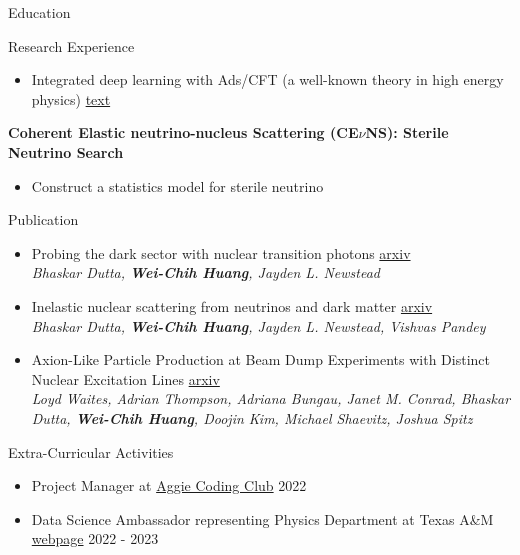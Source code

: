 \documentclass{resume}
\begin{document}
\begin{rSection}{Education}
\begin{rSection}{Research Experience}
\begin{itemize}
    \itemsep -3pt {}
    \item Integrated deep learning with Ads/CFT (a well-known theory in high energy physics) \href{https://noctildon.github.io/files/pdf/archive/DL.pdf}{text}
    \end{itemize}
\item \textbf{Coherent Elastic neutrino-nucleus Scattering (CE$\nu$NS): Sterile Neutrino Search}
    \begin{itemize}
    \itemsep -3pt {}
    \item Construct a statistics model for sterile neutrino
    \end{itemize}
\end{rSection}


\begin{rSection}{Publication}
    \begin{itemize}
        \item Probing the dark sector with nuclear transition photons \hfill \href{https://arxiv.org/pdf/2302.10250.pdf}{arxiv}\\
        {\footnotesize \it Bhaskar Dutta, \textbf{Wei-Chih Huang}, Jayden L. Newstead}
        \item Inelastic nuclear scattering from neutrinos and dark matter \hfill \href{https://arxiv.org/pdf/2206.08590.pdf}{arxiv}\\
        {\footnotesize \it Bhaskar Dutta, \textbf{Wei-Chih Huang}, Jayden L. Newstead, Vishvas Pandey}
        \item Axion-Like Particle Production at Beam Dump Experiments with Distinct Nuclear Excitation Lines \hfill \href{https://arxiv.org/pdf/2207.13659.pdf}{arxiv}\\
        {\footnotesize \it Loyd Waites, Adrian Thompson, Adriana Bungau, Janet M. Conrad, Bhaskar Dutta, \textbf{Wei-Chih Huang}, Doojin Kim, Michael Shaevitz, Joshua Spitz}
    \end{itemize}
\end{rSection}


\begin{rSection}{Extra-Curricular Activities}
    \begin{itemize}
        \item Project Manager at \href{https://aggiecodingclub.com/}{Aggie Coding Club} \hfill 2022
        \item Data Science Ambassador representing Physics Department at Texas A\&M \href{https://noctildon.github.io/DS_ambassador/index.html}{webpage} \hfill 2022 - 2023
    \end{itemize}
\end{rSection}




\end{rSection}
\end{document}
